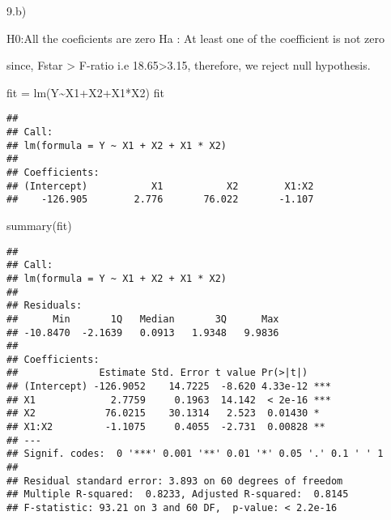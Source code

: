 \documentclass[
]{article}
\newenvironment{Shaded}{\begin{snugshade}}{\end{snugshade}}
\newcommand{\FunctionTok}[1]{\textcolor[rgb]{0.00,0.00,0.00}{#1}}
\newcommand{\NormalTok}[1]{#1}
\newcommand{\OtherTok}[1]{\textcolor[rgb]{0.56,0.35,0.01}{#1}}
\newcommand{\SpecialCharTok}[1]{\textcolor[rgb]{0.00,0.00,0.00}{#1}}
\begin{document}
9.b)

H0:All the coeficients are zero Ha : At least one of the coefficient is
not zero

since, Fstar \textgreater{} F-ratio i.e 18.65\textgreater3.15,
therefore, we reject null hypothesis.

\begin{Shaded}
\begin{Highlighting}[]
\NormalTok{fit }\OtherTok{=} \FunctionTok{lm}\NormalTok{(Y}\SpecialCharTok{\textasciitilde{}}\NormalTok{X1}\SpecialCharTok{+}\NormalTok{X2}\SpecialCharTok{+}\NormalTok{X1}\SpecialCharTok{*}\NormalTok{X2)}
\NormalTok{fit}
\end{Highlighting}
\end{Shaded}

\begin{verbatim}
## 
## Call:
## lm(formula = Y ~ X1 + X2 + X1 * X2)
## 
## Coefficients:
## (Intercept)           X1           X2        X1:X2  
##    -126.905        2.776       76.022       -1.107
\end{verbatim}

\begin{Shaded}
\begin{Highlighting}[]
\FunctionTok{summary}\NormalTok{(fit)}
\end{Highlighting}
\end{Shaded}

\begin{verbatim}
## 
## Call:
## lm(formula = Y ~ X1 + X2 + X1 * X2)
## 
## Residuals:
##      Min       1Q   Median       3Q      Max 
## -10.8470  -2.1639   0.0913   1.9348   9.9836 
## 
## Coefficients:
##              Estimate Std. Error t value Pr(>|t|)    
## (Intercept) -126.9052    14.7225  -8.620 4.33e-12 ***
## X1             2.7759     0.1963  14.142  < 2e-16 ***
## X2            76.0215    30.1314   2.523  0.01430 *  
## X1:X2         -1.1075     0.4055  -2.731  0.00828 ** 
## ---
## Signif. codes:  0 '***' 0.001 '**' 0.01 '*' 0.05 '.' 0.1 ' ' 1
## 
## Residual standard error: 3.893 on 60 degrees of freedom
## Multiple R-squared:  0.8233, Adjusted R-squared:  0.8145 
## F-statistic: 93.21 on 3 and 60 DF,  p-value: < 2.2e-16
\end{verbatim}

\begin{Shaded}
\end{Shaded}
\end{document}
